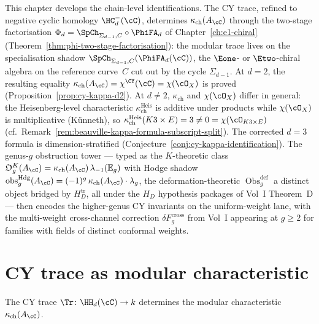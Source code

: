 This chapter develops the chain-level identifications. The CY trace, refined to negative cyclic homology $\HC^-_d(\cC)$, determines $\kappa_{\mathrm{ch}}(A_\cC)$ through the two-stage factorisation $\Phi_d = \SpCh_{\Sigma_{d-1}, C} \circ \PhiFA_d$ of Chapter~\ref{ch:e1-chiral} (Theorem~\ref{thm:phi-two-stage-factorisation}): the modular trace lives on the specialisation shadow $\SpCh_{\Sigma_{d-1}, C}(\PhiFA_d(\cC))$, the $\Eone$- or $\Etwo$-chiral algebra on the reference curve~$C$ cut out by the cycle $\Sigma_{d-1}$. At $d = 2$, the resulting equality $\kappa_{\mathrm{ch}}(A_\cC) = \chi^{\CY}(\cC) = \chi(\cO_X)$ is proved (Proposition~\ref{prop:cy-kappa-d2}). At $d \neq 2$, $\kappa_{\mathrm{ch}}$ and $\chi(\cO_X)$ differ in general: the Heisenberg-level characteristic $\kappa_{\mathrm{ch}}^{\mathrm{Heis}}$ is additive under products while $\chi(\cO_X)$ is multiplicative (K\"unneth), so $\kappa_{\mathrm{ch}}^{\mathrm{Heis}}(K3 \times E) = 3 \neq 0 = \chi(\cO_{K3 \times E})$ (cf.\ Remark~\ref{rem:beauville-kappa-formula-subscript-split}). The corrected $d = 3$ formula is dimension-stratified (Conjecture~\ref{conj:cy-kappa-identification}). The genus-$g$ obstruction tower --- typed as the $K$-theoretic class $\mathfrak O_g^K(A_\cC) = \kappa_{\mathrm{ch}}(A_\cC)\,\lambda_{-1}(\mathbb E_g)$ with Hodge shadow $\mathrm{obs}_g^{\mathrm{Hdg}}(A_\cC) = (-1)^g\,\kappa_{\mathrm{ch}}(A_\cC)\cdot\lambda_g$, the deformation-theoretic $\operatorname{Obs}^{\mathrm{def}}_g$ a distinct object bridged by $H_D^{\mathrm{tr}}$, all under the $H_D$ hypothesis packages of Vol~I Theorem~D --- then encodes the higher-genus CY invariants on the uniform-weight lane, with the multi-weight cross-channel correction $\delta F_g^{\mathrm{cross}}$ from Vol~I appearing at $g \geq 2$ for families with fields of distinct conformal weights.

\section{CY trace as modular characteristic}
\label{sec:cy-trace-kappa}

The CY trace $\Tr \colon \HH_d(\cC) \to k$ determines the modular characteristic $\kappa_{\mathrm{ch}}(A_\cC)$.

